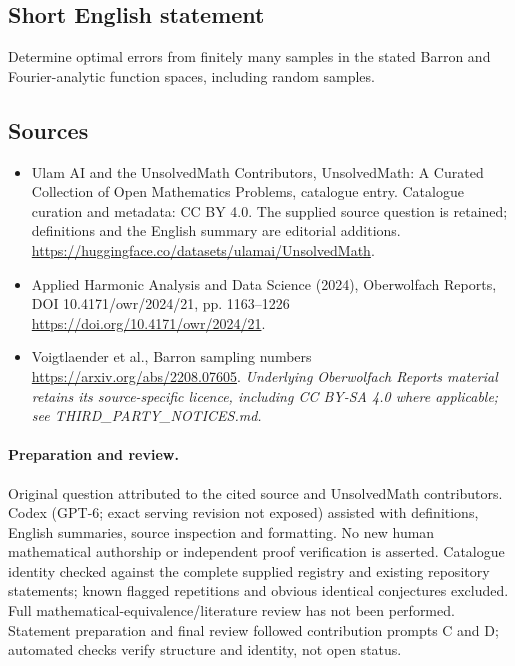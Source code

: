 \documentclass[11pt]{article}
\begin{document}
\subsection{Short English statement}
Determine optimal errors from finitely many samples in the stated Barron and Fourier-analytic function spaces, including random samples.
\subsection{Sources}
\begin{itemize}
\item[\hypertarget{source:statement:1}{S1}] Ulam AI and the UnsolvedMath Contributors, UnsolvedMath: A Curated Collection of Open Mathematics Problems, catalogue entry. Catalogue curation and metadata: CC BY 4.0. The supplied source question is retained; definitions and the English summary are editorial additions.
\url{https://huggingface.co/datasets/ulamai/UnsolvedMath}.
\item[\hypertarget{source:statement:2}{S2}] Applied Harmonic Analysis and Data Science (2024), Oberwolfach Reports, DOI 10.4171/owr/2024/21, pp. 1163--1226
\url{https://doi.org/10.4171/owr/2024/21}.
\item[\hypertarget{source:statement:3}{S3}] Voigtlaender et al., Barron sampling numbers
\url{https://arxiv.org/abs/2208.07605}.
\textit{Underlying Oberwolfach Reports material retains its source-specific licence, including CC BY-SA 4.0 where applicable; see THIRD\_PARTY\_NOTICES.md.}
\end{itemize}
\paragraph{Preparation and review.}
Original question attributed to the cited source and UnsolvedMath contributors. Codex (GPT-6; exact serving revision not exposed) assisted with definitions, English summaries, source inspection and formatting. No new human mathematical authorship or independent proof verification is asserted. Catalogue identity checked against the complete supplied registry and existing repository statements; known flagged repetitions and obvious identical conjectures excluded. Full mathematical-equivalence/literature review has not been performed. Statement preparation and final review followed contribution prompts C and D; automated checks verify structure and identity, not open status.
\label{end:statement}
\end{document}
